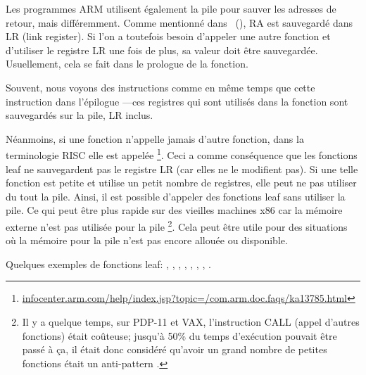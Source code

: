 
Les programmes ARM utilisent également la pile pour sauver les adresses de retour,
mais différemment.
Comme mentionné dans \q{\HelloWorldSectionName}~(),
\ac{RA} est sauvegardé dans \ac{LR} (\gls{link register}).
Si l'on a toutefois besoin d'appeler une autre fonction et d'utiliser le registre
\ac{LR} une fois de plus, sa valeur doit être sauvegardée.
Usuellement, cela se fait dans le prologue de la fonction.

Souvent, nous voyons des instructions comme  en même temps
que cette instruction dans l'épilogue ---ces registres qui
sont utilisés dans la fonction sont sauvegardés sur la pile, \ac{LR} inclus.

Néanmoins, si une fonction n'appelle jamais d'autre fonction, dans la terminologie
\ac{RISC} elle est appelée \emph{}\footnote{\href{http://infocenter.arm.com/help/index.jsp?topic=/com.arm.doc.faqs/ka13785.html}{infocenter.arm.com/help/index.jsp?topic=/com.arm.doc.faqs/ka13785.html}}.
Ceci a comme conséquence que les fonctions leaf ne sauvegardent pas le registre
\ac{LR} (car elles ne le modifient pas).
Si une telle fonction est petite et utilise un petit nombre de registres, elle
peut ne pas utiliser du tout la pile.
Ainsi, il est possible d'appeler des fonctions leaf sans utiliser la pile.
Ce qui peut être plus rapide sur des vieilles machines x86 car la mémoire externe
n'est pas utilisée pour la pile
\footnote{Il y a quelque temps, sur PDP-11 et VAX, l'instruction CALL (appel d'autres fonctions) était coûteuse; jusqu'à 50\%
du temps d'exécution pouvait être passé à ça, il était donc considéré qu'avoir un grand nombre de petites fonctions était un \gls{anti-pattern} .}.
Cela peut être utile pour des situations où la mémoire pour la pile n'est pas
encore allouée ou disponible.

Quelques exemples de fonctions leaf:
, ,
, , ,
, , .

